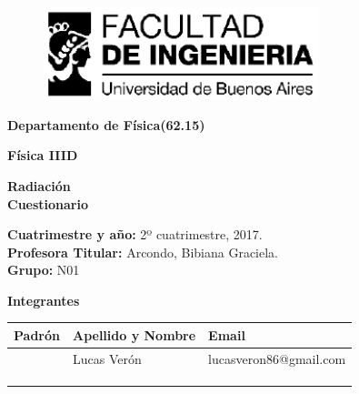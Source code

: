 \documentclass[10pt,a4paper]{article}
\author{lmv}
\begin{document}
\begin{titlepage}
\begin{center}
\vspace*{-1in}
\begin{figure}[htb]
\begin{center}
\includegraphics[width=8cm]{./logo}
\end{center}
\end{figure}
\begin{LARGE}
\textbf{Departamento de Física(62.15)}\\
\end{LARGE}
\vspace*{0.15in}
\begin{LARGE}
\textbf{Física IIID}\\
\end{LARGE}
\vspace*{0.3in}
\begin{Huge}
\textbf{Radiación}\\
\textbf{Cuestionario}\\
\end{Huge}
\vspace*{0.15in}
\vspace*{0.2in}
\begin{flushleft}
\textbf{Cuatrimestre y año:} 2º cuatrimestre, 2017.\\
\textbf{Profesora Titular:} Arcondo, Bibiana Graciela.\\
\textbf{Grupo:} N01 \\
\vspace*{0.2in}
\end{flushleft}
\begin{large}
\raggedright\textbf{Integrantes}\\
\end{large}
\vspace*{0.1in}
\begin{flushleft}
\begin{tabular}{| >{\centering\arraybackslash}p{4.9cm}| >{\centering\arraybackslash}m{4.9cm}|  >{\centering\arraybackslash}m{4.9cm} |}
\hline
\textbf{Padrón} & \textbf{Apellido y Nombre} & \textbf{Email}\\
\hline
89341& Lucas Verón & lucasveron86@gmail.com\\
\hline
 &   & \\
\hline
 &   & \\
\hline
 &   & \\
\hline
 

\end{tabular}
\end{flushleft}
\end{center}
\end{titlepage}
\end{document}
